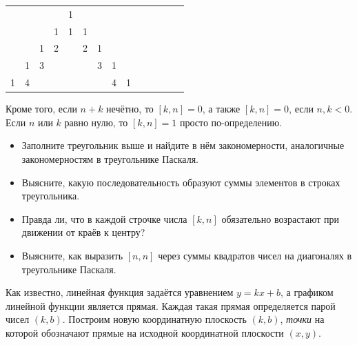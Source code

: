 \documentclass[10pt]{scrbook} \usepackage{modules/nonstahp_book}
\begin{document}
\begin{center}
\begin{tabular}{c c c c c c c c c c c c c c}
 &  &  &  & 1&  &  &  & \\%
 &  &  & 1& 1& 1&  &  & \\ %
 &  & 1& 2&  & 2& 1&  & \\%
 & 1& 3&  &  &  & 3& 1& \\%
1& 4&  &  &  &  &  & 4& 1%
\end{tabular}
\end{center}
Кроме того, если $n+k$ нечётно, то $[k,n] = 0$, а также $[k,n] = 0$, если $n,k < 0$. Если $n$ или $k$ равно нулю, то $[k,n] = 1$ просто по-определению.
\begin{itemize}
\item Заполните треугольник выше и найдите в нём закономерности, аналогичные закономерностям в треугольнике Паскаля.
\item Выясните, какую последовательность образуют суммы элементов в строках треугольника.
\item Правда ли, что в каждой строчке числа $[k,n]$ обязательно возрастают при движении от краёв к центру?
\item Выясните, как выразить $[n,n]$ через суммы квадратов чисел на диагоналях в треугольнике Паскаля.
\end{itemize}



Как известно, линейная функция задаётся уравнением $y = kx + b$, а графиком линейной функции является прямая. Каждая такая прямая определяется парой чисел $(k,b)$. Построим новую координатную плоскость $(k,b)$, {\itshape точки} на которой обозначают прямые на исходной координатной плоскости $(x,y)$. 
\end{document}
